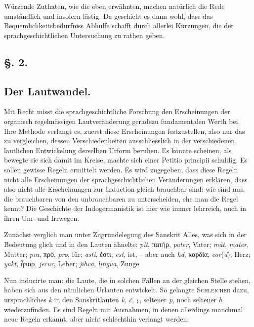 {Würzende Zuthaten, wie die eben erwähnten, machen natürlich die Rede umständlich und insofern lästig. Da geschieht es dann wohl, dass das Bequemlichkeitsbedürfniss Abhülfe schafft durch allerlei Kürzungen, die der sprachgeschichtlichen Untersuchung zu rathen geben.

\subsection*{§. 2.}\label{III.II.II.2}
\subsection*{Der Lautwandel.}
Mit Recht misst die sprachgeschichtliche Forschung den Erscheinungen der organisch regelmässigen Lautveränderung geradezu fundamentalen Werth bei. Ihre Methode verlangt es, zuerst diese Erscheinungen festzustellen, also nur das zu vergleichen, dessen Verschiedenheiten ausschliesslich in der verschiedenen lautlichen Entwickelung derselben Urform beruhen. Es könnte scheinen, als bewegte sie sich damit im Kreise, machte sich einer Petitio principii schuldig. Es sollen gewisse Regeln ermittelt werden. Es wird zugegeben, dass diese Regeln nicht alle Erscheinungen der sprachgeschichtlichen Veränderungen erklären, dass also nicht alle Erscheinungen zur Induction gleich brauchbar sind: wie sind nun die brauchbaren von den unbrauchbaren zu unterscheiden, \label{fp.196} ehe man die Regel kennt? Die Geschichte der Indogermanistik ist hier wie immer lehrreich, auch in ihren Um- und Irrwegen.

Zunächst verglich man unter Zugrundelegung des Sanskrit Alles, was sich in der Bedeutung glich und in den Lauten ähnelte: \textit{pit}, πατήρ, \textit{pater}, Vater; \textit{mât},  \textit{mater}, Mutter; \textit{pra}, πρὸ, \textit{pro}, für; \textit{asti}, ἐστι, \textit{est}, ist, – aber auch \textit{hd}, καρδία, \textit{cor}(\textit{d}), Herz; \textit{yakt}, ἧπαρ, \textit{jecur}, Leber; \textit{jihvā}, \textit{lingua}, Zunge  

Nun inducirte man: die Laute, die in solchen Fällen an der gleichen Stelle stehen, haben sich aus den nämlichen Urlauten entwickelt. So gelangte \textsc{Schleicher} dazu, ursprachliches \textit{k} in den Sanskritlauten \textit{k}, \textit{č}, \textit{ç}, seltener \textit{p}, noch seltener \textit{h} \label{sp.186} wiederzufinden. Es sind Regeln mit Ausnahmen, in denen allerdings manchmal neue Regeln erkannt, aber nicht schlechthin verlangt werden.

}
